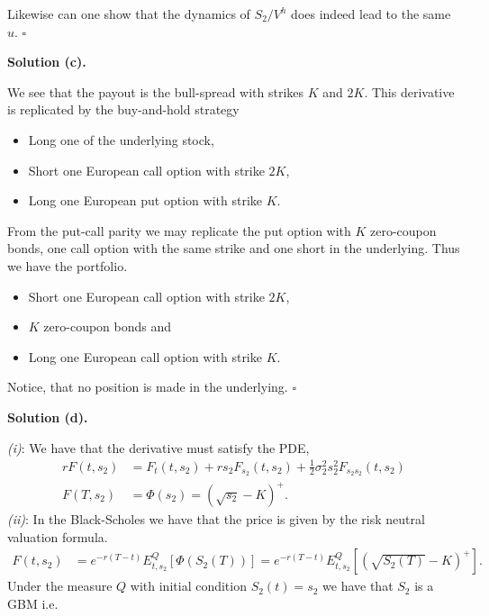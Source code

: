 \documentclass[a4paper,12pt,openany]{book}
\providecommand{\tightlist}{%
 \setlength{\itemsep}{0pt}\setlength{\parskip}{0pt}}
\begin{document}
Likewise can one show that the dynamics of \(S_2/V^h\) does indeed lead to the same \(u\). \(\square\)

\noindent\makebox[\linewidth]{\rule{\textwidth}{0.4pt}}

\textbf{Solution (c).}

We see that the payout is the bull-spread with strikes \(K\) and \(2K\). This derivative is replicated by the buy-and-hold strategy

\begin{itemize}
\tightlist
\item
  Long one of the underlying stock,
\item
  Short one European call option with strike \(2K\),
\item
  Long one European put option with strike \(K\).
\end{itemize}

From the put-call parity we may replicate the put option with \(K\) zero-coupon bonds, one call option with the same strike and one short in the underlying. Thus we have the portfolio.

\begin{itemize}
\tightlist
\item
  Short one European call option with strike \(2K\),
\item
  \(K\) zero-coupon bonds and
\item
  Long one European call option with strike \(K\).
\end{itemize}

Notice, that no position is made in the underlying. \(\square\)

\noindent\makebox[\linewidth]{\rule{\textwidth}{0.4pt}}

\textbf{Solution (d).}

\emph{(i)}: We have that the derivative must satisfy the PDE,
\begin{align*}
rF(t,s_2)&=F_t(t,s_2)+rs_2F_{s_2}(t,s_2)+\frac{1}{2}\sigma_2^2s_2^2F_{s_2s_2}(t,s_2)\\
F(T,s_2)&=\Phi(s_2)=(\sqrt{s_2}-K)^+.
\end{align*}
\emph{(ii)}: In the Black-Scholes we have that the price is given by the risk neutral valuation formula.
\begin{align*}
F(t,s_2)&=e^{-r(T-t)}E^Q_{t,s_2}\left[\Phi(S_2(T))\right]=e^{-r(T-t)}E^Q_{t,s_2}\left[\left(\sqrt{S_2(T)}-K\right)^+\right].
\end{align*}
Under the measure \(Q\) with initial condition \(S_2(t)=s_2\) we have that \(S_2\) is a GBM i.e.
\end{document}
